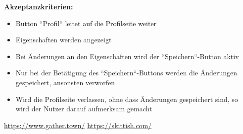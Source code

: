 \documentclass[conference]{IEEEtran}
\begin{document}
	\textbf{Akzeptanzkriterien:}
	\begin{itemize}
		\item Button ``Profil`` leitet auf die Profilseite weiter
		\item Eigenschaften werden angezeigt
		\item Bei Änderungen an den Eigenschaften wird der ``Speichern``-Button aktiv
		\item Nur bei der Betätigung des ``Speichern``-Buttons werden die Änderungen gespeichert, ansonsten verworfen
		\item Wird die Profilseite verlassen, ohne dass Änderungen gespeichert sind, so wird der Nutzer darauf aufmerksam gemacht
	\end{itemize}
	
	\begin{thebibliography}{99}
		
	 \url{https://www.gather.town/} 
	 \url{https://skittish.com/}
	
	
	\end{thebibliography}
\end{document}
